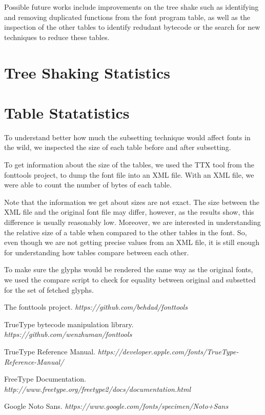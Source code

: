 \documentclass[12pt]{article}
\begin{document}
Possible future works include improvements on the tree shake such as
identifying and removing duplicated functions from the font program
table, as well as the inspection of the other tables to identify
redudant bytecode or the search for new techniques to reduce these
tables.

\clearpage
\begin{appendices}
\section{Tree Shaking Statistics}



\section{Table Statatistics}

To understand better how much the subsetting technique would affect
fonts in the wild, we inspected the size of each table before and after
subsetting.

To get information about the size of the tables, we used the TTX tool
from the fonttools project, to dump the font file into an XML file. With
an XML file, we were able to count the number of bytes of each table.

Note that the information we get about sizes are not exact. The size
between the XML file and the original font file may differ, however, as the
results show, this difference is usually reasonably low. Moreover, we
are interested in understanding the relative size of a table when
compared to the other tables in the font. So, even though we are not
getting precise values from an XML file, it is still enough for
understanding how tables compare between each other.

To make sure the glyphs would be rendered the same way as the original
fonts, we used the compare script to check for equality between original
and subsetted for the set of fetched glyphs. 



\end{appendices}

\clearpage
\begin{thebibliography}{1}

 The fonttools project. {\em https://github.com/behdad/fonttools } 

 TrueType bytecode manipulation library. 
{\em https://github.com/wenzhuman/fonttools } 

 TrueType Reference Manual. 
{\em https://developer.apple.com/fonts/TrueType-Reference-Manual/ } 

 FreeType Documentation.
{\em http://www.freetype.org/freetype2/docs/documentation.html }

 Google Noto Sans. 
{\em https://www.google.com/fonts/specimen/Noto+Sans } 

\end{thebibliography}
\end{document}
